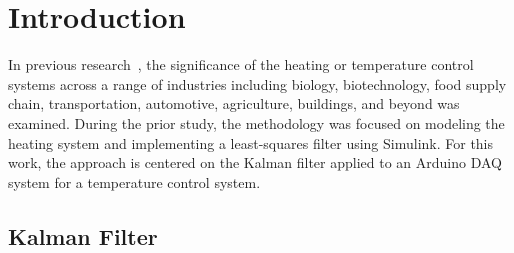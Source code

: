 \section{Introduction}
In previous research~\cite{obregon2024lsf}, the significance of the heating or temperature control systems across a range of industries including biology, biotechnology, food supply chain, transportation, automotive, agriculture, buildings, and beyond was examined. During the prior study, the methodology was focused on modeling the heating system and implementing a least-squares filter using Simulink. For this work, the approach is centered on the Kalman filter applied to an Arduino DAQ system for a temperature control system.


\subsection{Kalman Filter}
~\cite{mendel1995lessons}


